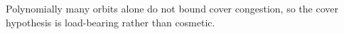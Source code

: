 Polynomially many orbits alone do not bound cover congestion, so the cover hypothesis is load-bearing rather than cosmetic.